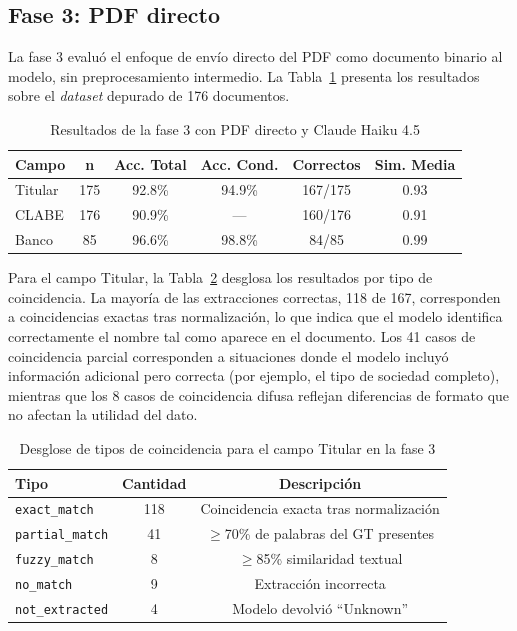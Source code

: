 \subsection{Fase 3: PDF directo}

La fase 3 evaluó el enfoque de envío directo del PDF como documento binario al modelo, sin preprocesamiento intermedio. La Tabla~\ref{tab:resultados-fase3} presenta los resultados sobre el \textit{dataset} depurado de 176 documentos.

\begin{table}[H]
\centering
\vspace{6pt}
\begin{tabular}{lccccc}
\toprule
\textbf{Campo} & \textbf{n} & \textbf{Acc. Total} & \textbf{Acc. Cond.} & \textbf{Correctos} & \textbf{Sim. Media} \\
\midrule
Titular & 175 & 92.8\% & 94.9\% & 167/175 & 0.93 \\
CLABE   & 176 & 90.9\% & ---    & 160/176 & 0.91 \\
Banco   &  85 & 96.6\% & 98.8\% &  84/85  & 0.99 \\
\bottomrule
\end{tabular}
\caption{Resultados de la fase 3 con PDF directo y Claude Haiku 4.5}
\label{tab:resultados-fase3}
\end{table}

Para el campo Titular, la Tabla~\ref{tab:match-types-titular} desglosa los resultados por tipo de coincidencia. La mayoría de las extracciones correctas, 118 de 167, corresponden a coincidencias exactas tras normalización, lo que indica que el modelo identifica correctamente el nombre tal como aparece en el documento. Los 41 casos de coincidencia parcial corresponden a situaciones donde el modelo incluyó información adicional pero correcta (por ejemplo, el tipo de sociedad completo), mientras que los 8 casos de coincidencia difusa reflejan diferencias de formato que no afectan la utilidad del dato.

\begin{table}[H]
\centering
\begin{tabular}{lcc}
\toprule
\textbf{Tipo} & \textbf{Cantidad} & \textbf{Descripción} \\
\midrule
\texttt{exact\_match}   & 118 & Coincidencia exacta tras normalización \\
\texttt{partial\_match} &  41 & $\geq$70\% de palabras del GT presentes \\
\texttt{fuzzy\_match}   &   8 & $\geq$85\% similaridad textual \\
\texttt{no\_match}      &   9 & Extracción incorrecta \\
\texttt{not\_extracted}  &   4 & Modelo devolvió ``Unknown'' \\
\bottomrule
\end{tabular}
\caption{Desglose de tipos de coincidencia para el campo Titular en la fase 3}
\label{tab:match-types-titular}
\end{table}

